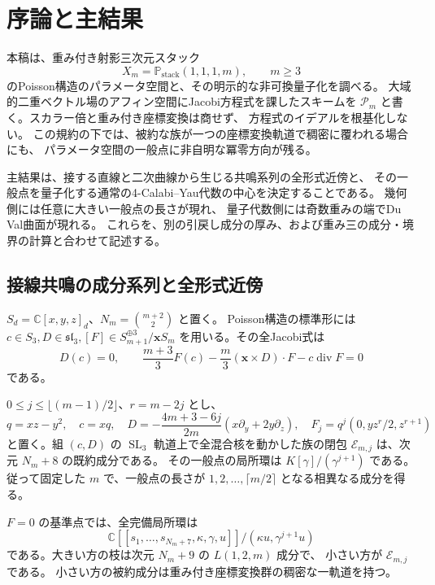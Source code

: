 \section{序論と主結果}

本稿は、重み付き射影三次元スタック
\[
 X_m=\mathbb P_{\mathrm{stack}}(1,1,1,m),\qquad m\ge3
\]
のPoisson構造のパラメータ空間と、その明示的な非可換量子化を調べる。
大域的二重ベクトル場のアフィン空間にJacobi方程式を課したスキームを
$\mathscr P_m$ と書く。スカラー倍と重み付き座標変換は商せず、
方程式のイデアルを根基化しない。
この規約の下では、被約な族が一つの座標変換軌道で稠密に覆われる場合にも、
パラメータ空間の一般点に非自明な冪零方向が残る。

主結果は、接する直線と二次曲線から生じる共鳴系列の全形式近傍と、
その一般点を量子化する通常の4-Calabi--Yau代数の中心を決定することである。
幾何側には任意に大きい一般点の長さが現れ、
量子代数側には奇数重みの端でDu Val曲面が現れる。
これらを、別の引戻し成分の厚み、および重み三の成分・境界の計算と合わせて記述する。

\subsection{接線共鳴の成分系列と全形式近傍}

$S_d=\mathbb C[x,y,z]_d$、$N_m=\binom{m+2}{2}$ と置く。
Poisson構造の標準形には
$c\in S_3,D\in\mathfrak{sl}_3,[F]\in S_{m+1}^{\oplus3}/\mathbf xS_m$
を用いる。その全Jacobi式は
\[
 D(c)=0,\qquad
 \frac{m+3}{3}F(c)-\frac m3(\mathbf x\times D)\cdot F-c\operatorname{div}F=0
\]
である。

\begin{theorem}[接線共鳴系列]
\label{thm:main-tangent-v34}
$0\le j\le\lfloor(m-1)/2\rfloor$、$r=m-2j$ とし、
\[
 q=xz-y^2,\quad c=xq,\quad
 D=-\frac{4m+3-6j}{2m}(x\partial_y+2y\partial_z),\quad
 F_j=q^j(0,yz^r/2,z^{r+1})
\]
と置く。組 $(c,D)$ の $\operatorname{SL}_3$ 軌道上で全混合核を動かした族の閉包
$\mathscr E_{m,j}$ は、次元 $N_m+8$ の既約成分である。
その一般点の局所環は $K[\gamma]/(\gamma^{j+1})$ である。
従って固定した $m$ で、一般点の長さが
$1,2,\ldots,\lceil m/2\rceil$ となる相異なる成分を得る。

$F=0$ の基準点では、全完備局所環は
\[
 \boxed{
 \mathbb C[[s_1,\ldots,s_{N_m+7},\kappa,\gamma,u]]/
              (\kappa u,\gamma^{j+1}u)
 }
\]
である。大きい方の枝は次元 $N_m+9$ の $L(1,2,m)$ 成分で、
小さい方が $\mathscr E_{m,j}$ である。
小さい方の被約成分は重み付き座標変換群の稠密な一軌道を持つ。
\end{theorem}

